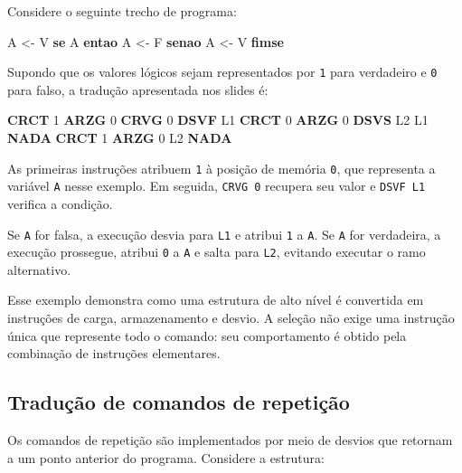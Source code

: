 \documentclass[
  brazilian,
  letterpaper,
]{book}
\newenvironment{Shaded}{\begin{snugshade}}{\end{snugshade}}
\newcommand{\DecValTok}[1]{\textcolor[rgb]{0.68,0.00,0.00}{#1}}
\newcommand{\FunctionTok}[1]{\textcolor[rgb]{0.28,0.35,0.67}{#1}}
\newcommand{\KeywordTok}[1]{\textcolor[rgb]{0.00,0.23,0.31}{\textbf{#1}}}
\newcommand{\NormalTok}[1]{\textcolor[rgb]{0.00,0.23,0.31}{#1}}
\theoremstyle{plain}
\theoremstyle{definition}
\theoremstyle{remark}
\begin{document}
Considere o seguinte trecho de programa:

\begin{Shaded}
\begin{Highlighting}[]
\NormalTok{A \textless{}{-} V}
\KeywordTok{se}\NormalTok{ A}
  \KeywordTok{entao}\NormalTok{ A \textless{}{-} F}
  \KeywordTok{senao}\NormalTok{ A \textless{}{-} V}
\KeywordTok{fimse}
\end{Highlighting}
\end{Shaded}

Supondo que os valores lógicos sejam representados por \texttt{1} para
verdadeiro e \texttt{0} para falso, a tradução apresentada nos slides é:

\begin{Shaded}
\begin{Highlighting}[]
    \KeywordTok{CRCT}  \DecValTok{1}
    \KeywordTok{ARZG}  \DecValTok{0}
    \KeywordTok{CRVG}  \DecValTok{0}
    \KeywordTok{DSVF}  \FunctionTok{L1}
    \KeywordTok{CRCT}  \DecValTok{0}
    \KeywordTok{ARZG}  \DecValTok{0}
    \KeywordTok{DSVS}  \FunctionTok{L2}
\FunctionTok{L1}  \KeywordTok{NADA}
    \KeywordTok{CRCT}  \DecValTok{1}
    \KeywordTok{ARZG}  \DecValTok{0}
\FunctionTok{L2}  \KeywordTok{NADA}
\end{Highlighting}
\end{Shaded}

As primeiras instruções atribuem \texttt{1} à posição de memória
\texttt{0}, que representa a variável \texttt{A} nesse exemplo. Em
seguida, \texttt{CRVG\ 0} recupera seu valor e \texttt{DSVF\ L1}
verifica a condição.

Se \texttt{A} for falsa, a execução desvia para \texttt{L1} e atribui
\texttt{1} a \texttt{A}. Se \texttt{A} for verdadeira, a execução
prossegue, atribui \texttt{0} a \texttt{A} e salta para \texttt{L2},
evitando executar o ramo alternativo.

Esse exemplo demonstra como uma estrutura de alto nível é convertida em
instruções de carga, armazenamento e desvio. A seleção não exige uma
instrução única que represente todo o comando: seu comportamento é
obtido pela combinação de instruções elementares.

\subsection{Tradução de comandos de
repetição}\label{traduuxe7uxe3o-de-comandos-de-repetiuxe7uxe3o}

Os comandos de repetição são implementados por meio de desvios que
retornam a um ponto anterior do programa. Considere a estrutura:
\end{document}
